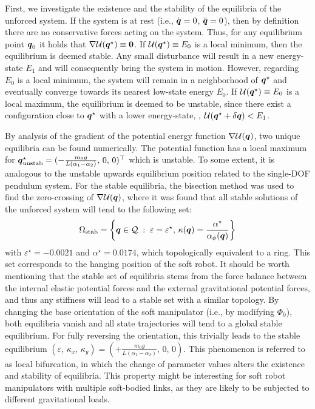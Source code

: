 First, we investigate the existence and the stability of the equilibria of the unforced system. If the system is at rest (i.e., ${\dot{\boldsymbol{q}}} = 0$, ${\ddot{\boldsymbol{q}}} = 0$), then by definition there are no conservative forces acting on the system. Thus, for any equilibrium point ${{\boldsymbol{q}}}_0$ it holds that $\nabla \mathcal{U}({{\boldsymbol{q}}}^\star) \equiv \boldsymbol{0}$. If $ \mathcal{U}({{\boldsymbol{q}}}^\star) \equiv E_0$ is a local minimum, then the equilibrium is deemed stable. Any small disturbance will result in a new energy-state $E_1$ and will consequently bring the system in motion. However, regarding $E_0$ is a local minimum, the system will remain in a neighborhood of ${{\boldsymbol{q}}}^\star$ and eventually converge towards its nearest low-state energy $E_0$. If $\mathcal{U}({{\boldsymbol{q}}}^\star) \equiv E_0$ is a local maximum, the equilibrium is deemed to be unstable, since there exist a configuration close to ${{\boldsymbol{q}}}^\star$ with a lower energy-state, \ie, $\mathcal{U}({{\boldsymbol{q}}}^\star + {\delta}{\boldsymbol{q}}) < E_1$.

By analysis of the gradient of the potential energy function $\nabla \mathcal{U}({{\boldsymbol{q}}})$, two unique equilibria can be found numerically. The potential function has a local maximum for ${\boldsymbol{q}}^\star_{\textrm{unstab}}=(-\tfrac{m_0 g}{L (\alpha_1 - \alpha_2)},\,0,\,0)^\top$ which is unstable. To some extent, it is analogous to the unstable upwards equilibrium position related to the single-DOF pendulum system. For the stable equilibria, the bisection method was used to find the zero-crossing of $\nabla \mathcal{U}({{\boldsymbol{q}}})$, where it was found that all stable solutions of the unforced system will tend to the following set:
%
\begin{equation*}
\Omega_{\textrm{stab}} = \left\{{\boldsymbol{q}}\in \mathcal{Q}\;:\;\varepsilon=\varepsilon^\star,\, \kappa({\boldsymbol{q}}) = \frac{\alpha^\star}{\alpha_\phi({\boldsymbol{q}})} \right\} \notag
\end{equation*}
%
with $\varepsilon^\star = -0.0021$ and $\alpha^\star = 0.0174$, which topologically equivalent to a ring. This set corresponds to the hanging position of the soft robot. It should be worth mentioning that the stable set of equilibria stems from the force balance between the internal elastic potential forces and the external gravitational potential forces, and thus any stiffness will lead to a stable set with a similar topology. By changing the base orientation of the soft manipulator (i.e., by modifying $\Phi_0$), both equilibria vanish and all state trajectories will tend to a global stable equilibrium. For fully reversing the orientation, this trivially leads to the stable equilibrium $(\varepsilon,\,\kappa_x,\,\kappa_y) = (+\tfrac{m_0 g}{L (\alpha_1 - \alpha_2)},\, 0,\, 0)$. This phenomenon is referred to as local bifurcation, in which the change of parameter values alters the existence and stability of equilibria. This property might be interesting for soft robot manipulators with multiple soft-bodied links, as they are likely to be subjected to different gravitational loads.

